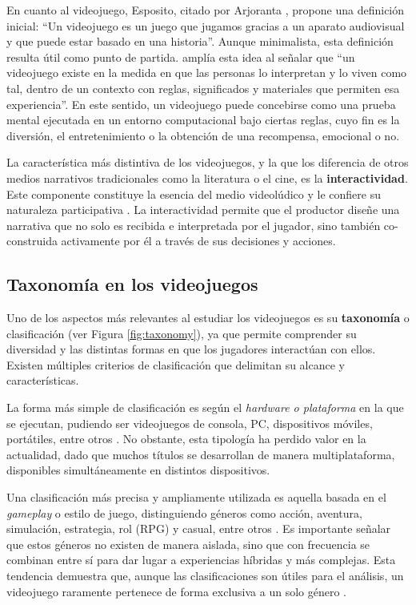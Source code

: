 En cuanto al videojuego, Esposito, citado por Arjoranta \cite{arjoranta_how_2019}, propone una definición inicial: “Un videojuego es un juego que jugamos gracias a un aparato audiovisual y que puede estar basado en una historia”. Aunque minimalista, esta definición resulta útil como punto de partida. \textcite{deterding2013modes} amplía esta idea al señalar que “un videojuego existe en la medida en que las personas lo interpretan y lo viven como tal, dentro de un contexto con reglas, significados y materiales que permiten esa experiencia”. En este sentido, un videojuego puede concebirse como una prueba mental ejecutada en un entorno computacional bajo ciertas reglas, cuyo fin es la diversión, el entretenimiento o la obtención de una recompensa, emocional o no.

La característica más distintiva de los videojuegos, y la que los diferencia de otros medios narrativos tradicionales como la literatura o el cine, es la \textbf{interactividad}. Este componente constituye la esencia del medio videolúdico y le confiere su naturaleza participativa \cite{lopez_canicio_cuando_2019}. La interactividad permite que el productor diseñe una narrativa que no solo es recibida e interpretada por el jugador, sino también co-construida activamente por él a través de sus decisiones y acciones. 

\subsection{Taxonomía en los videojuegos}

Uno de los aspectos más relevantes al estudiar los videojuegos es su
\textbf{taxonomía} o clasificación (ver Figura \ref{fig:taxonomy}), ya que permite comprender su diversidad
y las distintas formas en que los jugadores interactúan con ellos. Existen
múltiples criterios de clasificación que delimitan su alcance y
características.

La forma más simple de clasificación es según el \textit{hardware o
	plataforma} en la que se ejecutan, pudiendo ser videojuegos de consola, PC,
dispositivos móviles, portátiles, entre otros
\cite{herrero_taxonomivideojuegos_2015}. No obstante, esta tipología ha
perdido valor en la actualidad, dado que muchos títulos se desarrollan de
manera multiplataforma, disponibles simultáneamente en distintos dispositivos.

Una clasificación más precisa y ampliamente utilizada es aquella basada en
el \textit{gameplay} o estilo de juego, distinguiendo géneros como acción,
aventura, simulación, estrategia, rol (RPG) y casual, entre otros
\cite{herrero_taxonomivideojuegos_2015}. Es importante señalar que estos
géneros no existen de manera aislada, sino que con frecuencia se combinan
entre sí para dar lugar a experiencias híbridas y más complejas. Esta
tendencia demuestra que, aunque las clasificaciones son útiles para el
análisis, un videojuego raramente pertenece de forma exclusiva a un solo
género \cite{Starosta_Kiszka_Szyszka_Starzec_Strojny_2024,
	grelier2023datadrivenclassificationsvideogame}.

